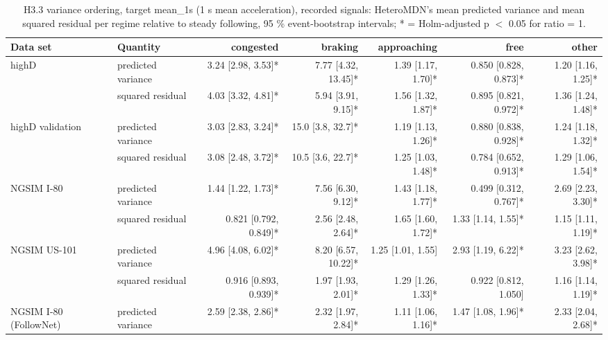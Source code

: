 \begin{table}[htbp]
\centering
\footnotesize
\caption{H3.3 variance ordering, target mean\_1s (1 s mean acceleration), recorded signals: HeteroMDN's mean predicted variance and mean squared residual per regime relative to steady following, 95 \% event-bootstrap intervals; * = Holm-adjusted p $<$ 0.05 for ratio = 1.}
\label{tab:t3-regime-variance--raw--mean-1s}
\begin{tabular}{llrrrrr}
\toprule
Data set & Quantity & congested & braking & approaching & free & other \\
\midrule
highD & predicted variance & 3.24 [2.98, 3.53]* & 7.77 [4.32, 13.45]* & 1.39 [1.17, 1.70]* & 0.850 [0.828, 0.873]* & 1.20 [1.16, 1.25]* \\
 & squared residual & 4.03 [3.32, 4.81]* & 5.94 [3.91, 9.15]* & 1.56 [1.32, 1.87]* & 0.895 [0.821, 0.972]* & 1.36 [1.24, 1.48]* \\
\midrule
highD validation & predicted variance & 3.03 [2.83, 3.24]* & 15.0 [3.8, 32.7]* & 1.19 [1.13, 1.26]* & 0.880 [0.838, 0.928]* & 1.24 [1.18, 1.32]* \\
 & squared residual & 3.08 [2.48, 3.72]* & 10.5 [3.6, 22.7]* & 1.25 [1.03, 1.48]* & 0.784 [0.652, 0.913]* & 1.29 [1.06, 1.54]* \\
\midrule
NGSIM I-80 & predicted variance & 1.44 [1.22, 1.73]* & 7.56 [6.30, 9.12]* & 1.43 [1.18, 1.77]* & 0.499 [0.312, 0.767]* & 2.69 [2.23, 3.30]* \\
 & squared residual & 0.821 [0.792, 0.849]* & 2.56 [2.48, 2.64]* & 1.65 [1.60, 1.72]* & 1.33 [1.14, 1.55]* & 1.15 [1.11, 1.19]* \\
\midrule
NGSIM US-101 & predicted variance & 4.96 [4.08, 6.02]* & 8.20 [6.57, 10.22]* & 1.25 [1.01, 1.55] & 2.93 [1.19, 6.22]* & 3.23 [2.62, 3.98]* \\
 & squared residual & 0.916 [0.893, 0.939]* & 1.97 [1.93, 2.01]* & 1.29 [1.26, 1.33]* & 0.922 [0.812, 1.050] & 1.16 [1.14, 1.19]* \\
\midrule
NGSIM I-80 (FollowNet) & predicted variance & 2.59 [2.38, 2.86]* & 2.32 [1.97, 2.84]* & 1.11 [1.06, 1.16]* & 1.47 [1.08, 1.96]* & 2.33 [2.04, 2.68]* \\

\end{tabular}
\end{table}
